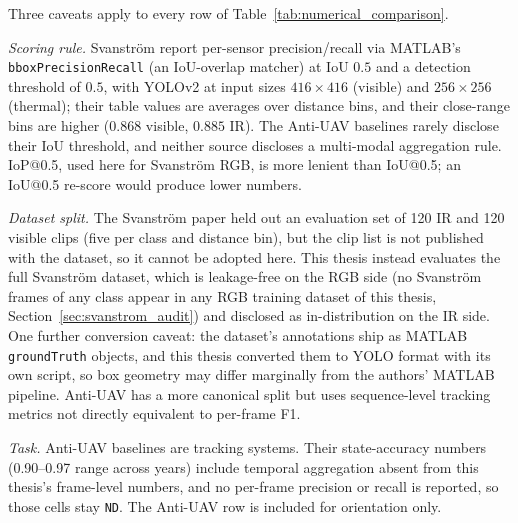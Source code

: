 Three caveats apply to every row of Table~\ref{tab:numerical_comparison}.

\emph{Scoring rule.} Svanstr\"om \etal report per-sensor precision/recall via MATLAB's \texttt{bboxPrecisionRecall} (an IoU-overlap matcher) at IoU $0.5$ and a detection threshold of $0.5$, with YOLOv2 at input sizes $416{\times}416$ (visible) and $256{\times}256$ (thermal); their table values are averages over distance bins, and their close-range bins are higher ($0.868$ visible, $0.885$ IR). The Anti-UAV baselines rarely disclose their IoU threshold, and neither source discloses a multi-modal aggregation rule. IoP@0.5, used here for Svanstr\"om RGB, is more lenient than IoU@0.5; an IoU@0.5 re-score would produce lower numbers.

\emph{Dataset split.} The Svanstr\"om paper held out an evaluation set of 120 IR and 120 visible clips (five per class and distance bin), but the clip list is not published with the dataset, so it cannot be adopted here. This thesis instead evaluates the full Svanstr\"om dataset, which is leakage-free on the RGB side (no Svanstr\"om frames of any class appear in any RGB training dataset of this thesis, Section~\ref{sec:svanstrom_audit}) and disclosed as in-distribution on the IR side. One further conversion caveat: the dataset's annotations ship as MATLAB \texttt{groundTruth} objects, and this thesis converted them to YOLO format with its own script, so box geometry may differ marginally from the authors' MATLAB pipeline. Anti-UAV has a more canonical split but uses sequence-level tracking metrics not directly equivalent to per-frame F1.

\emph{Task.} Anti-UAV baselines are tracking systems. Their state-accuracy numbers (0.90--0.97 range across years) include temporal aggregation absent from this thesis's frame-level numbers, and no per-frame precision or recall is reported, so those cells stay \texttt{ND}. The Anti-UAV row is included for orientation only.

